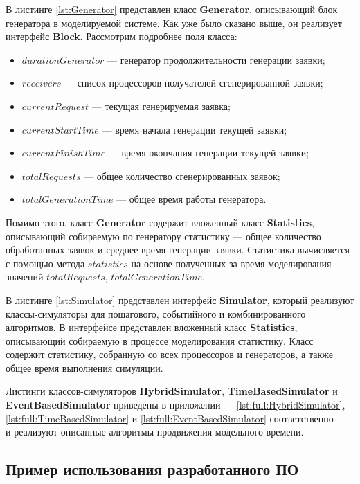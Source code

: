В листинге \ref{lst:Generator} представлен класс \textbf{Generator}, описывающий блок генератора в моделируемой системе. Как уже было сказано выше, он реализует интерфейс \textbf{Block}. Рассмотрим подробнее поля класса:
\begin{itemize}
	\item $durationGenerator$ --- генератор продолжительности генерации заявки;
	\item $receivers$ --- список процессоров-получателей сгенерированной заявки;
	\item $currentRequest$ --- текущая генерируемая заявка;
	\item $currentStartTime$ --- время начала генерации текущей заявки;
	\item $currentFinishTime$ --- время окончания генерации текущей заявки;
	\item $totalRequests$ --- общее количество сгенерированных заявок;
	\item $totalGenerationTime$ --- общее время работы генератора.
\end{itemize}
Помимо этого, класс \textbf{Generator} содержит вложенный класс \textbf{Statistics}, описывающий собираемую по генератору статистику --- общее количество обработанных заявок и среднее время генерации заявки. Статистика вычисляется с помощью метода $statistics$ на основе полученных за время моделирования значений $totalRequests$, $totalGenerationTime$.


В листинге \ref{lst:Simulator} представлен интерфейс \textbf{Simulator}, который реализуют классы-симуляторы для пошагового, событийного и комбинированного алгоритмов. В интерфейсе представлен вложенный класс \textbf{Statistics}, описывающий собираемую в процессе моделирования статистику. Класс содержит статистику, собранную со всех процессоров и генераторов, а также общее время выполнения симуляции.

Листинги классов-симуляторов \textbf{HybridSimulator}, \textbf{TimeBasedSimulator} и \textbf{EventBasedSimulator} приведены в приложении --- \ref{lst:full:HybridSimulator}, \ref{lst:full:TimeBasedSimulator} и \ref{lst:full:EventBasedSimulator} соответственно --- и реализуют описанные алгоритмы продвижения модельного времени.

\subsection{Пример использования разработанного ПО}



